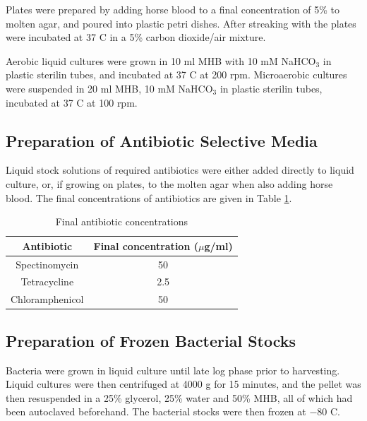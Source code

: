 Plates were prepared by adding horse blood to a final concentration of 5\% to molten agar, and poured into plastic petri dishes. After streaking with \Nm{} the plates were incubated at 37 \textdegree C in a 5\% carbon dioxide/air mixture.

Aerobic liquid cultures were grown in 10 ml MHB with 10 mM NaHCO$_\textrm{3}$ in plastic sterilin tubes, and incubated at 37 \textdegree C at 200 rpm. Microaerobic cultures were suspended in 20 ml MHB, 10 mM NaHCO$_\textrm{3}$ in plastic sterilin tubes, incubated at 37 \textdegree C at 100 rpm.

\subsection{Preparation of Antibiotic Selective Media}
Liquid stock solutions of required antibiotics were either added directly to liquid culture, or, if growing on plates, to the molten agar when also adding horse blood. The final concentrations of antibiotics are given in Table \ref{tab:antibiotic-concs}.

\begin{table}[here]
\begin{center}
\begin{tabular}{cc}
\toprule
\textbf{Antibiotic} & \textbf{Final concentration ($\mu$g/ml)} \\
\midrule
Spectinomycin & 50 \\
Tetracycline & 2.5 \\
Chloramphenicol & 50 \\
\bottomrule
\end{tabular} 
\end{center}
\caption{Final antibiotic concentrations
\label{tab:antibiotic-concs}}
\end{table}

\subsection{Preparation of Frozen Bacterial Stocks}
Bacteria were grown in liquid culture until late log phase prior to harvesting. Liquid cultures were then centrifuged at 4000 g for 15 minutes, and the pellet was then resuspended in a 25\% glycerol, 25\% water and 50\% MHB, all of which had been autoclaved beforehand. The bacterial stocks were then frozen at $-80$ \textdegree C.

